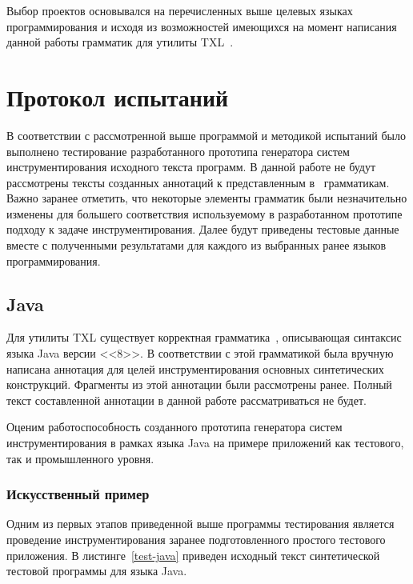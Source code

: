 Выбор проектов основывался на перечисленных выше целевых языках программирования и исходя из возможностей имеющихся на момент написания данной работы грамматик для утилиты TXL~\cite{txl-resources}.

\section{Протокол испытаний}

В соответствии с рассмотренной выше программой и методикой испытаний было выполнено тестирование разработанного прототипа генератора систем инструментирования исходного текста программ.
В данной работе не будут рассмотрены тексты созданных аннотаций к представленным в~\cite{txl-resources} грамматикам.
Важно заранее отметить, что некоторые элементы грамматик были незначительно изменены для большего соответствия используемому в разработанном прототипе подходу к задаче инструментирования.
Далее будут приведены тестовые данные вместе с полученными результатами для каждого из выбранных ранее языков программирования.

\subsection{Java}

Для утилиты TXL существует корректная грамматика~\cite{txl-resources}, описывающая синтаксис языка Java версии <<8>>.
В соответствии с этой грамматикой была вручную написана аннотация для целей инструментирования основных синтетических конструкций.
Фрагменты из этой аннотации были рассмотрены ранее.
Полный текст составленной аннотации в данной работе рассматриваться не будет.

Оценим работоспособность созданного прототипа генератора систем инструментирования в рамках языка Java на примере приложений как тестового, так и промышленного уровня.

\subsubsection{Искусственный пример}

Одним из первых этапов приведенной выше программы тестирования является проведение инструментирования заранее подготовленного простого тестового приложения.
В листинге~\ref{test-java} приведен исходный текст синтетической тестовой программы для языка Java.

